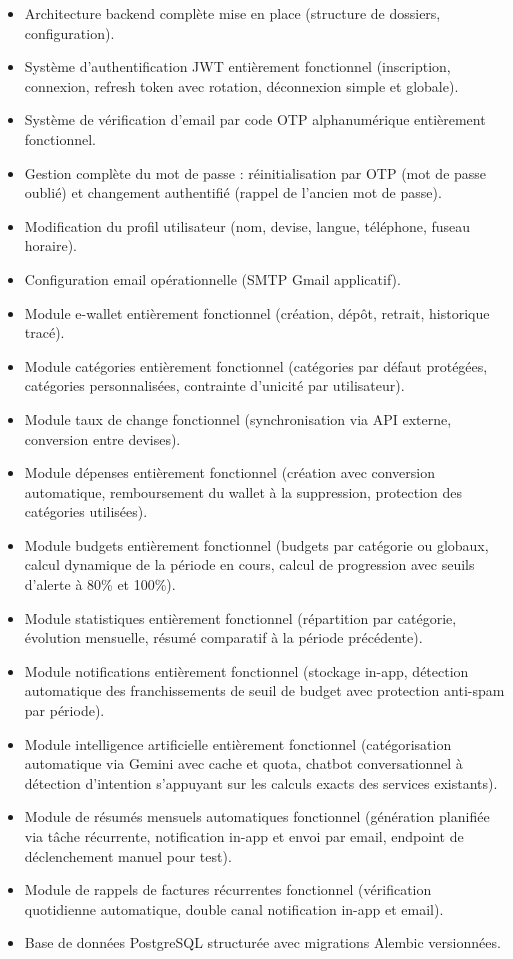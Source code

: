 \documentclass[11pt,a4paper]{article}
\begin{document}
\begin{itemize}[leftmargin=*]
    \item Architecture backend complète mise en place (structure de dossiers, configuration).
    \item Système d'authentification JWT entièrement fonctionnel (inscription, connexion, refresh token avec rotation, déconnexion simple et globale).
    \item Système de vérification d'email par code OTP alphanumérique entièrement fonctionnel.
    \item Gestion complète du mot de passe : réinitialisation par OTP (mot de passe oublié) et changement authentifié (rappel de l'ancien mot de passe).
    \item Modification du profil utilisateur (nom, devise, langue, téléphone, fuseau horaire).
    \item Configuration email opérationnelle (SMTP Gmail applicatif).
    \item Module e-wallet entièrement fonctionnel (création, dépôt, retrait, historique tracé).
    \item Module catégories entièrement fonctionnel (catégories par défaut protégées, catégories personnalisées, contrainte d'unicité par utilisateur).
    \item Module taux de change fonctionnel (synchronisation via API externe, conversion entre devises).
    \item Module dépenses entièrement fonctionnel (création avec conversion automatique, remboursement du wallet à la suppression, protection des catégories utilisées).
    \item Module budgets entièrement fonctionnel (budgets par catégorie ou globaux, calcul dynamique de la période en cours, calcul de progression avec seuils d'alerte à 80\% et 100\%).
    \item Module statistiques entièrement fonctionnel (répartition par catégorie, évolution mensuelle, résumé comparatif à la période précédente).
    \item Module notifications entièrement fonctionnel (stockage in-app, détection automatique des franchissements de seuil de budget avec protection anti-spam par période).
    \item Module intelligence artificielle entièrement fonctionnel (catégorisation automatique via Gemini avec cache et quota, chatbot conversationnel à détection d'intention s'appuyant sur les calculs exacts des services existants).
    \item Module de résumés mensuels automatiques fonctionnel (génération planifiée via tâche récurrente, notification in-app et envoi par email, endpoint de déclenchement manuel pour test).
    \item Module de rappels de factures récurrentes fonctionnel (vérification quotidienne automatique, double canal notification in-app et email).
    \item Base de données PostgreSQL structurée avec migrations Alembic versionnées.
\end{itemize}
\end{document}
